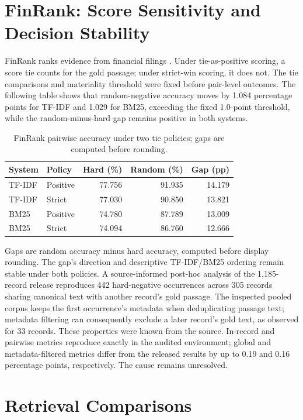 \documentclass[runningheads]{llncs}
\begin{document}
\section{FinRank: Score Sensitivity and Decision
Stability}\label{finrank-score-sensitivity-and-decision-stability}

FinRank ranks evidence from financial filings \cite{r1}. Under
tie-as-positive scoring, a score tie counts for the gold passage; under
strict-win scoring, it does not. The tie comparisons and materiality
threshold were fixed before pair-level outcomes. The following table
shows that random-negative accuracy moves by 1.084 percentage points for
TF-IDF and 1.029 for BM25, exceeding the fixed 1.0-point threshold,
while the random-minus-hard gap remains positive in both systems.

\begin{table}[htbp]
\caption{FinRank pairwise accuracy under two tie policies; gaps are computed before rounding.}
\label{tab:finrank}
\centering
\setlength{\tabcolsep}{6pt}
\begin{tabular}{llrrr}
\hline
System & Policy & Hard (\%) & Random (\%) & Gap (pp) \\
\hline
TF-IDF & Positive & 77.756 & 91.935 & 14.179 \\
TF-IDF & Strict & 77.030 & 90.850 & 13.821 \\
BM25 & Positive & 74.780 & 87.789 & 13.009 \\
BM25 & Strict & 74.094 & 86.760 & 12.666 \\
\hline
\end{tabular}
\end{table}

Gaps are random accuracy minus hard accuracy, computed before display
rounding. The gap's direction and descriptive TF-IDF/BM25 ordering
remain stable under both policies. A source-informed post-hoc analysis
of the 1,185-record release reproduces 442 hard-negative occurrences
across 305 records sharing canonical text with another record's gold
passage. The inspected pooled corpus keeps the first occurrence's
metadata when deduplicating passage text; metadata filtering can
consequently exclude a later record's gold text, as observed for 33
records. These properties were known from the source. In-record and
pairwise metrics reproduce exactly in the audited environment; global
and metadata-filtered metrics differ from the released results by up to
0.19 and 0.16 percentage points, respectively. The cause remains
unresolved.

\section{Retrieval Comparisons}\label{retrieval-comparisons}
\end{document}
